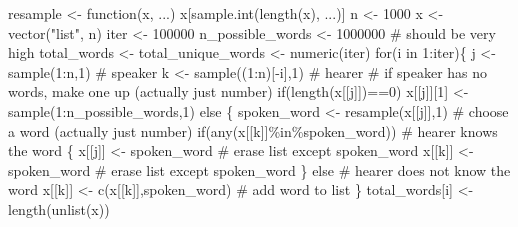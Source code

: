 \documentclass[
  a4paper,
  DIV=11,
  numbers=noendperiod,
  oneside]{scrreprt}
\newenvironment{Shaded}{}{}
\newcommand{\CommentTok}[1]{\textcolor[rgb]{0.42,0.45,0.49}{#1}}
\newcommand{\ControlFlowTok}[1]{\textcolor[rgb]{0.84,0.23,0.29}{#1}}
\newcommand{\DecValTok}[1]{\textcolor[rgb]{0.00,0.36,0.77}{#1}}
\newcommand{\FunctionTok}[1]{\textcolor[rgb]{0.44,0.26,0.76}{#1}}
\newcommand{\NormalTok}[1]{\textcolor[rgb]{0.14,0.16,0.18}{#1}}
\newcommand{\OtherTok}[1]{\textcolor[rgb]{0.44,0.26,0.76}{#1}}
\newcommand{\SpecialCharTok}[1]{\textcolor[rgb]{0.00,0.36,0.77}{#1}}
\newcommand{\StringTok}[1]{\textcolor[rgb]{0.01,0.18,0.38}{#1}}
\begin{document}
\begin{Shaded}
\begin{Highlighting}[]
\NormalTok{resample }\OtherTok{\textless{}{-}} \ControlFlowTok{function}\NormalTok{(x, ...) x[}\FunctionTok{sample.int}\NormalTok{(}\FunctionTok{length}\NormalTok{(x), ...)]}
\NormalTok{n }\OtherTok{\textless{}{-}} \DecValTok{1000}
\NormalTok{x }\OtherTok{\textless{}{-}} \FunctionTok{vector}\NormalTok{(}\StringTok{"list"}\NormalTok{, n)}
\NormalTok{iter }\OtherTok{\textless{}{-}} \DecValTok{100000}
\NormalTok{n\_possible\_words }\OtherTok{\textless{}{-}} \DecValTok{1000000} \CommentTok{\# should be very high}
\NormalTok{total\_words }\OtherTok{\textless{}{-}}\NormalTok{ total\_unique\_words }\OtherTok{\textless{}{-}} \FunctionTok{numeric}\NormalTok{(iter)}
\ControlFlowTok{for}\NormalTok{(i }\ControlFlowTok{in} \DecValTok{1}\SpecialCharTok{:}\NormalTok{iter)\{}
\NormalTok{  j }\OtherTok{\textless{}{-}} \FunctionTok{sample}\NormalTok{(}\DecValTok{1}\SpecialCharTok{:}\NormalTok{n,}\DecValTok{1}\NormalTok{) }\CommentTok{\# speaker}
\NormalTok{  k }\OtherTok{\textless{}{-}} \FunctionTok{sample}\NormalTok{((}\DecValTok{1}\SpecialCharTok{:}\NormalTok{n)[}\SpecialCharTok{{-}}\NormalTok{i],}\DecValTok{1}\NormalTok{) }\CommentTok{\# hearer}
  \CommentTok{\# if speaker has no words, make one up (actually just number)}
  \ControlFlowTok{if}\NormalTok{(}\FunctionTok{length}\NormalTok{(x[[j]])}\SpecialCharTok{==}\DecValTok{0}\NormalTok{) x[[j]][}\DecValTok{1}\NormalTok{] }\OtherTok{\textless{}{-}} \FunctionTok{sample}\NormalTok{(}\DecValTok{1}\SpecialCharTok{:}\NormalTok{n\_possible\_words,}\DecValTok{1}\NormalTok{) }\ControlFlowTok{else} 
\NormalTok{  \{}
\NormalTok{    spoken\_word }\OtherTok{\textless{}{-}} \FunctionTok{resample}\NormalTok{(x[[j]],}\DecValTok{1}\NormalTok{) }\CommentTok{\# choose a word (actually just number)}
    \ControlFlowTok{if}\NormalTok{(}\FunctionTok{any}\NormalTok{(x[[k]]}\SpecialCharTok{\%in\%}\NormalTok{spoken\_word)) }\CommentTok{\# hearer knows the word}
\NormalTok{    \{}
\NormalTok{      x[[j]] }\OtherTok{\textless{}{-}}\NormalTok{ spoken\_word }\CommentTok{\# erase list except spoken\_word}
\NormalTok{      x[[k]] }\OtherTok{\textless{}{-}}\NormalTok{ spoken\_word }\CommentTok{\# erase list except spoken\_word}
\NormalTok{    \} }\ControlFlowTok{else} \CommentTok{\# hearer does not know the word}
\NormalTok{      x[[k]] }\OtherTok{\textless{}{-}} \FunctionTok{c}\NormalTok{(x[[k]],spoken\_word)  }\CommentTok{\# add word to list}
\NormalTok{  \} }
\NormalTok{  total\_words[i] }\OtherTok{\textless{}{-}} \FunctionTok{length}\NormalTok{(}\FunctionTok{unlist}\NormalTok{(x))}

\end{Highlighting}
\end{Shaded}
\end{document}

